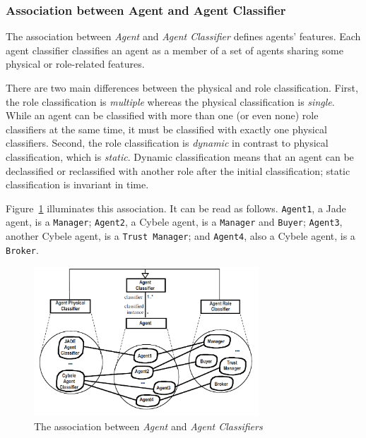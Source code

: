 \subsubsection*{Association between Agent and Agent Classifier}

The association between \textit{Agent} and \textit{Agent Classifier} defines agents' features.
Each agent classifier classifies an agent as a member of a set of agents sharing some physical or role-related features.

There are two main differences between the physical and role classification. First, the role classification is \textit{multiple} whereas the physical classification is \textit{single}.
While an agent can be classified with more than one (or even none) role classifiers at the same time, it must be classified with exactly one physical classifiers.
Second, the role classification is \textit{dynamic} in contrast to physical classification, which is \textit{static}.
Dynamic classification means that an agent can be declassified or reclassified with another role after the initial classification; static classification is invariant in time.

Figure~\ref{figure:onp-agent-agent-classifier-association} illuminates this association.
It can be read as follows. \texttt{Agent1}, a Jade agent, is a \texttt{Manager}; \texttt{Agent2}, a Cybele agent, is a \texttt{Manager} and \texttt{Buyer}; \texttt{Agent3}, another Cybele agent, is a \texttt{Trust Manager}; and \texttt{Agent4}, also a Cybele agent, is a \texttt{Broker}.

\begin{figure}[ht]
	\centering
	\includegraphics[width=0.75\textwidth]{images/onp/agent-agent-classifier-association.png}
	\caption{The association between \textit{Agent} and \textit{Agent Classifiers}}
	\label{figure:onp-agent-agent-classifier-association}
\end{figure}

